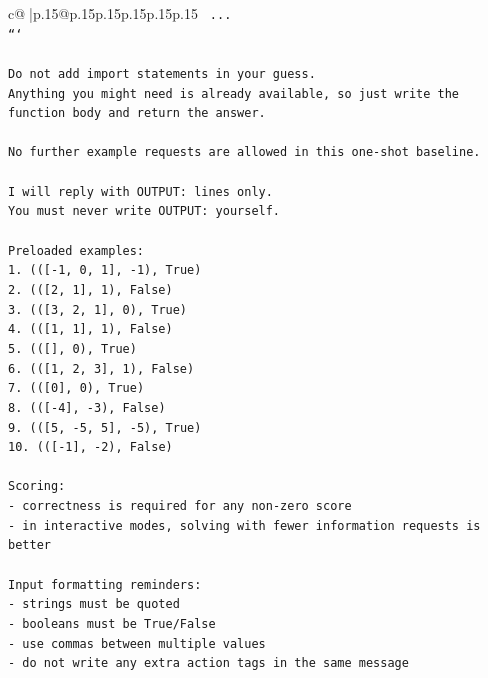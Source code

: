 \documentclass{article}
\begin{document}
{\begin{supertabular}{c@{$\;$}|p{.15\linewidth}@{}p{.15\linewidth}p{.15\linewidth}p{.15\linewidth}p{.15\linewidth}p{.15\linewidth}}
{{{\texttt{    ...} \\
\texttt{```} \\
\\ 
\texttt{Do not add import statements in your guess.} \\
\texttt{Anything you might need is already available, so just write the function body and return the answer.} \\
\\ 
\texttt{No further example requests are allowed in this one{-}shot baseline.} \\
\\ 
\texttt{I will reply with OUTPUT: lines only.} \\
\texttt{You must never write OUTPUT: yourself.} \\
\\ 
\texttt{Preloaded examples:} \\
\texttt{1. (({[}{-}1, 0, 1{]}, {-}1), True)} \\
\texttt{2. (({[}2, 1{]}, 1), False)} \\
\texttt{3. (({[}3, 2, 1{]}, 0), True)} \\
\texttt{4. (({[}1, 1{]}, 1), False)} \\
\texttt{5. (({[}{]}, 0), True)} \\
\texttt{6. (({[}1, 2, 3{]}, 1), False)} \\
\texttt{7. (({[}0{]}, 0), True)} \\
\texttt{8. (({[}{-}4{]}, {-}3), False)} \\
\texttt{9. (({[}5, {-}5, 5{]}, {-}5), True)} \\
\texttt{10. (({[}{-}1{]}, {-}2), False)} \\
\\ 
\texttt{Scoring:} \\
\texttt{{-} correctness is required for any non{-}zero score} \\
\texttt{{-} in interactive modes, solving with fewer information requests is better} \\
\\ 
\texttt{Input formatting reminders:} \\
\texttt{{-} strings must be quoted} \\
\texttt{{-} booleans must be True/False} \\
\texttt{{-} use commas between multiple values} \\
\texttt{{-} do not write any extra action tags in the same message} \\
\\ 
}}}
\end{supertabular}}
\end{document}
